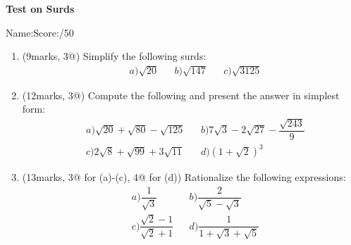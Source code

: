 \documentclass[12pt]{article}
\begin{document}
    \begin{center}
        \textbf{Test on Surds}
    \end{center}
    Name:\hrulefill \hfill Score:\hrulefill/50
    \begin{enumerate}
        \item (9marks, 3@) Simplify the following surds:\begin{align*}
            &a) \sqrt{20} && b) \sqrt{147} && c) \sqrt{3125}
        \end{align*}

        \hrulefill

        \hrulefill

        \hrulefill

        \hrulefill

        \hrulefill

        \hrulefill
        \item (12marks, 3@) Compute the following and present the answer in simplest form: \begin{align*}
            &a) \sqrt{20}+\sqrt{80}-\sqrt{125} && b) 7\sqrt{3}-2\sqrt{27}-\dfrac{\sqrt{243}}{9}\\
            &c) 2\sqrt{8}+\sqrt{99}+3\sqrt{11} && d) (1+\sqrt{2})^3
        \end{align*}

        \hrulefill

        \hrulefill

        \hrulefill

        \hrulefill

        \hrulefill

        \hrulefill

        \hrulefill

        \hrulefill

        \hrulefill

        \hrulefill

        \hrulefill

        \hrulefill
        \item (13marks, 3@ for (a)-(c), 4@ for (d)) Rationalize the following expressions: \begin{align*}
            &a) \dfrac{1}{\sqrt{3}} && b) \dfrac{2}{\sqrt{5}-\sqrt{3}}\\
            &c) \dfrac{\sqrt{2}-1}{\sqrt{2}+1} && d) \dfrac{1}{1+\sqrt{3}+\sqrt{5}}
        \end{align*}

        \hrulefill


\end{enumerate}
\end{document}
